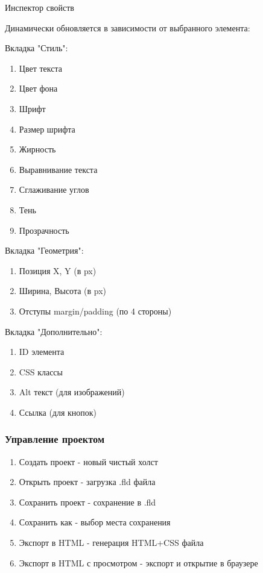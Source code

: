 \documentclass[14pt,a4paper]{extarticle}
\begin{document}
{{{Инспектор свойств

Динамически обновляется в зависимости от выбранного элемента:

Вкладка "Стиль":

\begin{enumerate}
    \item Цвет текста
    \item Цвет фона
    \item Шрифт
    \item Размер шрифта
    \item Жирность
    \item Выравнивание текста
    \item Сглаживание углов
    \item Тень
    \item Прозрачность
\end{enumerate}

Вкладка "Геометрия":

\begin{enumerate}
    \item Позиция X, Y (в px)
    \item Ширина, Высота (в px)
    \item Отступы margin/padding (по 4 стороны)
\end{enumerate}

Вкладка "Дополнительно":

\begin{enumerate}
    \item ID элемента
    \item CSS классы
    \item Alt текст (для изображений)
    \item Ссылка (для кнопок)
\end{enumerate}
}

\subsubsection{Управление проектом}

\begin{enumerate}
    \item Создать проект - новый чистый холст
    \item Открыть проект - загрузка .fld файла
    \item Сохранить проект - сохранение в .fld
    \item Сохранить как - выбор места сохранения
    \item Экспорт в HTML - генерация HTML+CSS файла
    \item Экспорт в HTML с просмотром - экспорт и открытие в браузере
\end{enumerate}

}}
\end{document}
